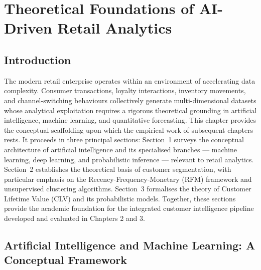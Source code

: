 
\chapter{\textbf{Theoretical Foundations of AI-Driven Retail Analytics}}

\section*{Introduction}

The modern retail enterprise operates within an environment of accelerating data complexity. Consumer transactions, loyalty interactions, inventory movements, and channel-switching behaviours collectively generate multi-dimensional datasets whose analytical exploitation requires a rigorous theoretical grounding in artificial intelligence, machine learning, and quantitative forecasting. This chapter provides the conceptual scaffolding upon which the empirical work of subsequent chapters rests. It proceeds in three principal sections: Section~1 surveys the conceptual architecture of artificial intelligence and its specialised branches — machine learning, deep learning, and probabilistic inference — relevant to retail analytics. Section~2 establishes the theoretical basis of customer segmentation, with particular emphasis on the Recency-Frequency-Monetary (RFM) framework and unsupervised clustering algorithms. Section~3 formalises the theory of Customer Lifetime Value (CLV) and its probabilistic models. Together, these sections provide the academic foundation for the integrated customer intelligence pipeline developed and evaluated in Chapters 2 and 3.

\section{Artificial Intelligence and Machine Learning: A Conceptual Framework}


